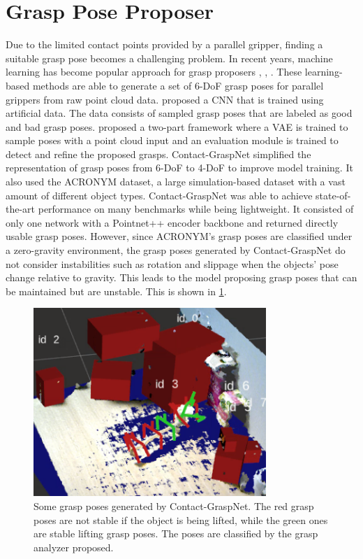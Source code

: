 \documentclass[12pt]{ucsddissertation}
\begin{document}
\section{Grasp Pose Proposer}
Due to the limited contact points provided by a parallel gripper, finding a suitable grasp pose becomes a challenging problem. In recent years, machine learning has become popular approach for grasp proposers \cite{ten_Pas_Gualtieri_Saenko_Platt_2017}, \cite{Mousavian_Eppner_Fox_2019}, \cite{Sundermeyer_Mousavian_Triebel_Fox_2021}. These learning-based methods are able to generate a set of 6-DoF grasp poses for parallel grippers from raw point cloud data. \cite{ten_Pas_Gualtieri_Saenko_Platt_2017} proposed a CNN that is trained using artificial data. The data consists of sampled grasp poses that are labeled as good and bad grasp poses. \cite{Mousavian_Eppner_Fox_2019} proposed a two-part framework where a VAE is trained to sample poses with a point cloud input and an evaluation module is trained to detect and refine the proposed grasps. Contact-GraspNet\cite{Sundermeyer_Mousavian_Triebel_Fox_2021} simplified the representation of grasp poses from 6-DoF to 4-DoF to improve model training. It also used the ACRONYM \cite{Eppner_Mousavian_Fox_2021} dataset, a large simulation-based dataset with a vast amount of different object types. Contact-GraspNet was able to achieve state-of-the-art performance on many benchmarks while being lightweight. It consisted of only one network with a Pointnet++ \cite{Qi2017PointNetDH} encoder backbone and returned directly usable grasp poses. However, since ACRONYM's grasp poses are classified under a zero-gravity environment, the grasp poses generated by Contact-GraspNet do not consider instabilities such as rotation and slippage when the objects' pose change relative to gravity. This leads to the model proposing grasp poses that can be maintained but are unstable. This is shown in \ref{fig:exampleGrasps}.

\begin{figure}
	\centering
	\includegraphics[width=250pt]{figures/grasps.png}
	\caption[Sample grasps from Contact-GraspNet]{Some grasp poses generated by Contact-GraspNet. The red grasp poses are not stable if the object is being lifted, while the green ones are stable lifting grasp poses. The poses are classified by the grasp analyzer proposed.}
	\label{fig:exampleGrasps}
\end{figure}
\end{document}

